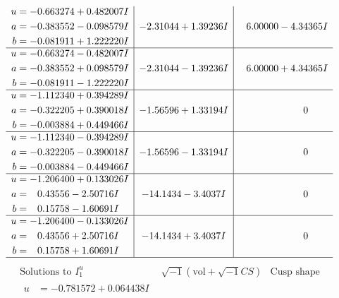 \documentclass[1p]{elsarticle_modified}
\theoremstyle{definition}
\newcommand{\I}{\sqrt{-1}}
\begin{document}
$$\begin{array}{c|c|c}
\begin{aligned}
u &= -0.663274 + 0.482007 I \\
a &= -0.383552 - 0.098579 I \\
b &= -0.081911 + 1.222220 I\end{aligned}
 & -2.31044 + 1.39236 I & \phantom{-}6.00000 - 4.34365 I \\ \hline\begin{aligned}
u &= -0.663274 - 0.482007 I \\
a &= -0.383552 + 0.098579 I \\
b &= -0.081911 - 1.222220 I\end{aligned}
 & -2.31044 - 1.39236 I & \phantom{-}6.00000 + 4.34365 I \\ \hline\begin{aligned}
u &= -1.112340 + 0.394289 I \\
a &= -0.322205 + 0.390018 I \\
b &= -0.003884 + 0.449466 I\end{aligned}
 & -1.56596 + 1.33194 I & \phantom{-0.000000 } 0 \\ \hline\begin{aligned}
u &= -1.112340 - 0.394289 I \\
a &= -0.322205 - 0.390018 I \\
b &= -0.003884 - 0.449466 I\end{aligned}
 & -1.56596 - 1.33194 I & \phantom{-0.000000 } 0 \\ \hline\begin{aligned}
u &= -1.206400 + 0.133026 I \\
a &= \phantom{-}0.43556 - 2.50716 I \\
b &= \phantom{-}0.15758 - 1.60691 I\end{aligned}
 & -14.1434 - 3.4037 I & \phantom{-0.000000 } 0 \\ \hline\begin{aligned}
u &= -1.206400 - 0.133026 I \\
a &= \phantom{-}0.43556 + 2.50716 I \\
b &= \phantom{-}0.15758 + 1.60691 I\end{aligned}
 & -14.1434 + 3.4037 I & \phantom{-0.000000 } 0\\
 \hline 
 \end{array}$$\newpage$$\begin{array}{c|c|c}  
\text{Solutions to }I^u_{1}& \I (\text{vol} + \sqrt{-1}CS) & \text{Cusp shape}\\
 \hline 
\begin{aligned}
u &= -0.781572 + 0.064438 I \\

\end{aligned}
\end{array}$$
\end{document}
